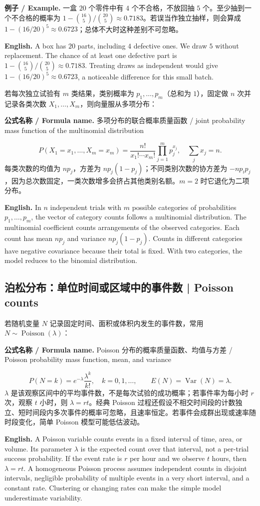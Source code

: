 \documentclass[UTF8,11pt,a4paper]{ctexart}
\newcommand{\EN}[1]{\par\noindent\textbf{English.} #1\par}
\newcommand{\FORMULA}[2]{\par\noindent\textbf{公式名称 / Formula name.} #1 / #2\par}
\newcommand{\EX}[2]{\par\noindent\textbf{例子 / Example.} #1\par\EN{#2}}
\begin{document}
\EX{一盒 $20$ 个零件中有 $4$ 个不合格，不放回抽 $5$ 个。至少抽到一个不合格的概率为 $1-\binom{16}{5}/\binom{20}{5}\approx0.7183$。若误当作独立抽样，则会算成 $1-(16/20)^5\approx0.6723$；总体不大时这种差别不可忽略。}{A box has $20$ parts, including $4$ defective ones. We draw $5$ without replacement. The chance of at least one defective part is $1-\binom{16}{5}/\binom{20}{5}\approx0.7183$. Treating draws as independent would give $1-(16/20)^5\approx0.6723$, a noticeable difference for this small batch.}

若每次独立试验有 $m$ 类结果，类别概率为 $p_1,\ldots,p_m$（总和为 $1$），固定做 $n$ 次并记录各类次数 $X_1,\ldots,X_m$，则向量服从多项分布：
\FORMULA{多项分布的联合概率质量函数}{joint probability mass function of the multinomial distribution}
\[
P(X_1=x_1,\ldots,X_m=x_m)=\frac{n!}{x_1!\cdots x_m!}\prod_{j=1}^mp_j^{x_j},\quad \sum_jx_j=n.
\]
每类次数的均值为 $np_j$，方差为 $np_j(1-p_j)$；不同类别次数的协方差为 $-np_ip_j$，因为总次数固定，一类次数增多会挤占其他类别名额。$m=2$ 时它退化为二项分布。
\EN{In $n$ independent trials with $m$ possible categories of probabilities $p_1,\ldots,p_m$, the vector of category counts follows a multinomial distribution. The multinomial coefficient counts arrangements of the observed categories. Each count has mean $np_j$ and variance $np_j(1-p_j)$. Counts in different categories have negative covariance because their total is fixed. With two categories, the model reduces to the binomial distribution.}

\subsection{泊松分布：单位时间或区域中的事件数 | Poisson counts}
若随机变量 $N$ 记录固定时间、面积或体积内发生的事件数，常用 $N\sim\operatorname{Poisson}(\lambda)$：
\FORMULA{Poisson 分布的概率质量函数、均值与方差}{Poisson probability mass function, mean, and variance}
\[
P(N=k)=e^{-\lambda}\frac{\lambda^k}{k!},\quad k=0,1,\ldots,\qquad E(N)=\operatorname{Var}(N)=\lambda.
\]
$\lambda$ 是该观察区间中的平均事件数，不是每次试验的成功概率；若事件率为每小时 $r$ 次，观察 $t$ 小时，则 $\lambda=rt$。经典 Poisson 过程还假设不相交时间段的计数独立、短时间段内多次事件的概率可忽略，且速率恒定。若事件会成群出现或速率随时段变化，简单 Poisson 模型可能低估波动。
\EN{A Poisson variable counts events in a fixed interval of time, area, or volume. Its parameter $\lambda$ is the expected count over that interval, not a per-trial success probability. If the event rate is $r$ per hour and we observe $t$ hours, then $\lambda=rt$. A homogeneous Poisson process assumes independent counts in disjoint intervals, negligible probability of multiple events in a very short interval, and a constant rate. Clustering or changing rates can make the simple model underestimate variability.}
\end{document}
